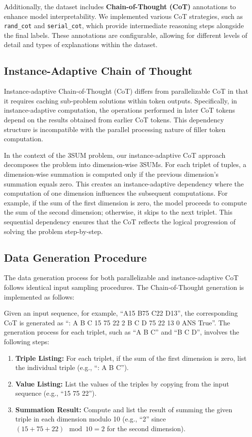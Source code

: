 \documentclass{article}
\begin{document}
Additionally, the dataset includes \textbf{Chain-of-Thought (CoT)} annotations to enhance model interpretability. We implemented various CoT strategies, such as \texttt{rand\_cot} and \texttt{serial\_cot}, which provide intermediate reasoning steps alongside the final labels. These annotations are configurable, allowing for different levels of detail and types of explanations within the dataset.

\subsection{Instance-Adaptive Chain of Thought}

Instance-adaptive Chain-of-Thought (CoT) differs from parallelizable CoT in that it requires caching sub-problem solutions within token outputs. Specifically, in instance-adaptive computation, the operations performed in later CoT tokens depend on the results obtained from earlier CoT tokens. This dependency structure is incompatible with the parallel processing nature of filler token computation.

In the context of the 3SUM problem, our instance-adaptive CoT approach decomposes the problem into dimension-wise 3SUMs. For each triplet of tuples, a dimension-wise summation is computed only if the previous dimension's summation equals zero. This creates an instance-adaptive dependency where the computation of one dimension influences the subsequent computations. For example, if the sum of the first dimension is zero, the model proceeds to compute the sum of the second dimension; otherwise, it skips to the next triplet. This sequential dependency ensures that the CoT reflects the logical progression of solving the problem step-by-step.

\subsection{Data Generation Procedure}

The data generation process for both parallelizable and instance-adaptive CoT follows identical input sampling procedures. The Chain-of-Thought generation is implemented as follows:

Given an input sequence, for example, ``A15 B75 C22 D13'', the corresponding CoT is generated as ``: A B C 15 75 22 2 B C D 75 22 13 0 ANS True''. The generation process for each triplet, such as ``A B C'' and ``B C D'', involves the following steps:

\begin{enumerate}
    \item \textbf{Triple Listing:} For each triplet, if the sum of the first dimension is zero, list the individual triple (e.g., ``: A B C'').
    \item \textbf{Value Listing:} List the values of the triples by copying from the input sequence (e.g., ``15 75 22'').
    \item \textbf{Summation Result:} Compute and list the result of summing the given triple in each dimension modulo 10 (e.g., ``2'' since \( (15 + 75 + 22) \mod 10 = 2 \) for the second dimension).
\end{enumerate}
\end{document}

